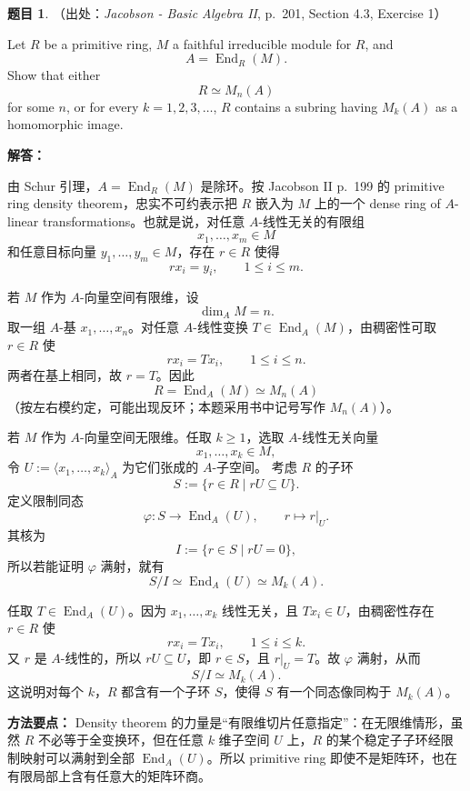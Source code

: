 \documentclass[a4paper]{ctexart}
\theoremstyle{definition}
\newtheorem{example}{题目}[section]
\theoremstyle{analysis}
\theoremstyle{plain}
\begin{document}
\begin{example}
（出处：\textit{Jacobson - Basic Algebra II}, p.~201, Section 4.3, Exercise 1）

Let \(R\) be a primitive ring, \(M\) a faithful irreducible module for \(R\), and
\[
  A=\operatorname{End}_R(M).
\]
Show that either
\[
  R\simeq M_n(A)
\]
for some \(n\), or for every \(k=1,2,3,\dots\), \(R\) contains a subring having \(M_k(A)\) as a homomorphic image.

\textbf{解答：}

由 Schur 引理，\(A=\operatorname{End}_R(M)\) 是除环。按 Jacobson II p.~199 的 primitive ring density theorem，忠实不可约表示把 \(R\) 嵌入为 \(M\) 上的一个 dense ring of \(A\)-linear transformations。也就是说，对任意 \(A\)-线性无关的有限组
\[
  x_1,\dots,x_m\in M
\]
和任意目标向量 \(y_1,\dots,y_m\in M\)，存在 \(r\in R\) 使得
\[
  rx_i=y_i,\qquad 1\le i\le m.
\]

若 \(M\) 作为 \(A\)-向量空间有限维，设
\[
  \dim_A M=n.
\]
取一组 \(A\)-基 \(x_1,\dots,x_n\)。对任意 \(A\)-线性变换 \(T\in\operatorname{End}_A(M)\)，由稠密性可取 \(r\in R\) 使
\[
  rx_i=T x_i,\qquad 1\le i\le n.
\]
两者在基上相同，故 \(r=T\)。因此
\[
  R=\operatorname{End}_A(M)\simeq M_n(A)
\]
（按左右模约定，可能出现反环；本题采用书中记号写作 \(M_n(A)\)）。

若 \(M\) 作为 \(A\)-向量空间无限维。任取 \(k\ge 1\)，选取 \(A\)-线性无关向量
\[
  x_1,\dots,x_k\in M,
\]
令 \(U:=\langle x_1,\dots,x_k\rangle_A\) 为它们张成的 \(A\)-子空间。
考虑 \(R\) 的子环
\[
  S:=\{r\in R\mid rU\subseteq U\}.
\]
定义限制同态
\[
  \varphi:S\longrightarrow \operatorname{End}_A(U),
  \qquad
  r\longmapsto r|_U.
\]
其核为
\[
  I:=\{r\in S\mid rU=0\},
\]
所以若能证明 \(\varphi\) 满射，就有
\[
  S/I\simeq \operatorname{End}_A(U)\simeq M_k(A).
\]

任取 \(T\in\operatorname{End}_A(U)\)。因为 \(x_1,\dots,x_k\) 线性无关，且 \(Tx_i\in U\)，由稠密性存在 \(r\in R\) 使
\[
  rx_i=Tx_i,\qquad 1\le i\le k.
\]
又 \(r\) 是 \(A\)-线性的，所以 \(rU\subseteq U\)，即 \(r\in S\)，且 \(r|_U=T\)。故 \(\varphi\) 满射，从而
\[
  S/I\simeq M_k(A).
\]
这说明对每个 \(k\)，\(R\) 都含有一个子环 \(S\)，使得 \(S\) 有一个同态像同构于 \(M_k(A)\)。

\textbf{方法要点：}
Density theorem 的力量是“有限维切片任意指定”：在无限维情形，虽然 \(R\) 不必等于全变换环，但在任意 \(k\) 维子空间 \(U\) 上，\(R\) 的某个稳定子子环经限制映射可以满射到全部 \(\operatorname{End}_A(U)\)。所以 primitive ring 即使不是矩阵环，也在有限局部上含有任意大的矩阵环商。
\end{example}
\end{document}
